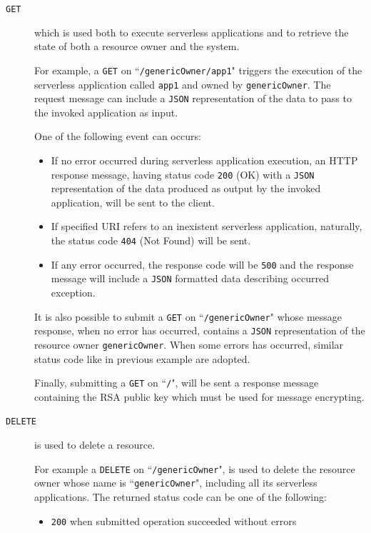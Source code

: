 \documentclass[12pt,a4paper]{report}
\newcommand{\QuoteIntro}{``}
\begin{document}
\begin{description}
	\item[\texttt{GET}]  which is used both to execute serverless applications and to retrieve the state of both a resource owner and the system.
	
	For example, a \texttt{GET} on \QuoteIntro\texttt{/genericOwner/app1}" triggers the execution of the serverless application called \texttt{app1} and owned by \texttt{genericOwner}. The request message can include a \texttt{JSON} representation of the data to pass to the invoked application as input.
	
	One of the following event can occurs:
	\begin{itemize}
		\item If no error occurred during serverless application execution, an HTTP response message, having status code \texttt{200} (OK) with a \texttt{JSON} representation of the data produced as output by the invoked application, will be sent to the client. 
		
		\item If specified URI refers to an inexistent serverless application, naturally, the status code \texttt{404} (Not Found) will be sent.
		
		\item If any error occurred, the response code will be \texttt{500} and the response message will include a \texttt{JSON} formatted data describing occurred exception.
	\end{itemize}

	It is also possible to submit a \texttt{GET} on \QuoteIntro\texttt{/genericOwner}" whose message response, when no error has occurred, contains a \texttt{JSON} representation of the resource owner \texttt{genericOwner}. When some errors has occurred, similar status code like in previous example are adopted.
	
	Finally, submitting a \texttt{GET} on \QuoteIntro\texttt{/}", will be sent a response message containing the RSA public key which must be used for message encrypting.
	
	\item[\texttt{DELETE}] is used to delete a resource. 
	
	For example a \texttt{DELETE} on \QuoteIntro\texttt{/genericOwner}", is used to delete the resource owner whose name is \QuoteIntro\texttt{genericOwner}", including all its serverless applications. The returned status code can be one of the following:
	
	\begin{itemize}
		\item \texttt{200} when submitted operation succeeded without errors
		

\end{itemize}
\end{description}
\end{document}
